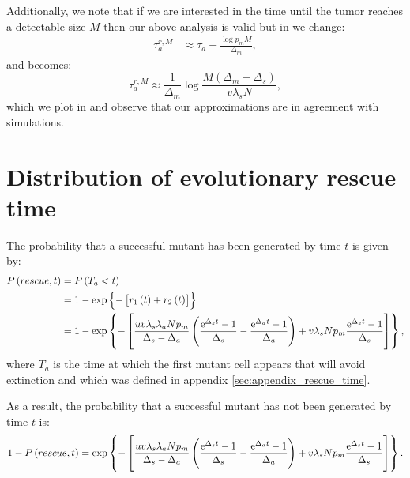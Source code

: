 \documentclass[12pt]{extarticle}
\newcommand{\e}{{\rm e}}
\begin{document}
\begin{appendices}
Additionally, we note that if we are interested in the time until the tumor reaches a detectable size $M$ then our above analysis is valid but in  we change:
\begin{align}\label{meanproliferationtime2}
\tau_a^{r,M}&\approx\tau_a+\frac{\log p_mM}{\Delta_m},
\end{align}
and  becomes:
\begin{equation}\label{eq:t2det2}
\tau_a^{r,M}\approx\frac{1}{\Delta_m}\log\frac{M\left(\Delta_m-\Delta_s\right)}{v\lambda_sN},
\end{equation}
which we plot in  and observe that our approximations are in agreement with simulations.

\section{Distribution of evolutionary rescue time}\label{sec:appendix_distribution_time}
The probability that a successful mutant has been generated by time $t$ is given by:
\begin{align*}
P\left(rescue,t\right)&=P\left(T_a<t\right)\\
&=1-\exp\left\{-\left[r_1\left(t\right)+r_2\left(t\right)\right]\right\}\\
&=1-\exp\left\{-\left[\frac{uv\lambda_s\lambda_aNp_m}{\Delta_s-\Delta_a}\left(\frac{\e^{\Delta_st}-1}{\Delta_s}-\frac{\e^{\Delta_at}-1}{\Delta_a}\right)+ v\lambda_sNp_m\frac{\e^{\Delta_s t}-1}{\Delta_s}\right]\right\},
\end{align*}
where $T_a$ is the time at which the first mutant cell appears that will avoid extinction and which was defined in appendix \ref{sec:appendix_rescue_time}.

As a result, the probability that a successful mutant has not been generated by time $t$ is:
\begin{equation}
1-P\left(rescue,t\right)=\exp\left\{-\left[\frac{uv\lambda_s\lambda_aNp_m}{\Delta_s-\Delta_a}\left(\frac{\e^{\Delta_st}-1}{\Delta_s}-\frac{\e^{\Delta_at}-1}{\Delta_a}\right)+ v\lambda_sNp_m\frac{\e^{\Delta_s t}-1}{\Delta_s}\right]\right\}.
\end{equation}

\end{appendices}
\end{document}
